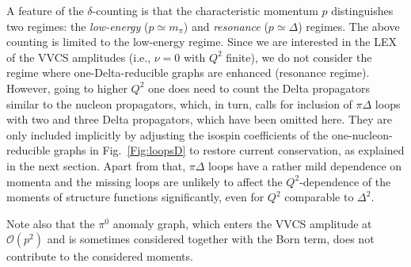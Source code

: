 \documentclass[11pt,preprint,tightenlines,
showpacs,preprintnumbers,amsmath,amssymb,superscriptaddress,a4paper,nofootinbib]{revtex4-1}
\def\eqlab#1{\label{eq:#1}}
\begin{document}

A feature of the $\delta$-counting is that the characteristic momentum
$p$ distinguishes two regimes: the {\it low-energy} ($p\simeq m_\pi$) and 
{\it resonance} ($p\simeq \varDelta$) regimes. The above counting is limited to the 
low-energy regime.
Since we are interested in the LEX of the  VVCS amplitudes (i.e., $\nu=0$ with $Q^2$ finite),
we do not consider the regime where one-Delta-reducible graphs are enhanced (resonance regime).
However, going to higher $Q^2$ one does need to count the 
Delta propagators similar to the nucleon propagators, which, in turn, calls for inclusion
of $\pi \Delta$ loops with two and three Delta propagators, which have been omitted here. They are only included implicitly 
 by adjusting the isospin coefficients of the one-nucleon-reducible graphs in Fig.~\ref{Fig:loopsD} to restore current conservation, as explained in the next section. Apart from that, $\pi \Delta$ loops have a rather mild
dependence on momenta and the missing loops are unlikely to  affect the
$Q^2$-dependence of the moments of structure functions significantly, even for $Q^2$ comparable to $\varDelta^2$. 





Note also that the $\pi^0$ anomaly graph, which enters the VVCS amplitude at $\mathcal{O}(p^2)$
and is sometimes considered together with the Born term, does not contribute to the considered moments.
\end{document}
